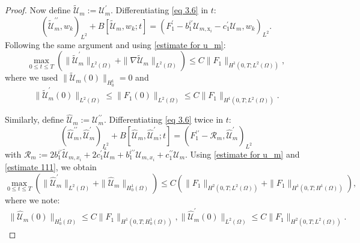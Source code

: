 \documentclass[11pt,reqno,oneside]{amsart}
\numberwithin{equation}{section}
\theoremstyle{definition}
\theoremstyle{remark}
\numberwithin{equation}{section}
\begin{document}
\begin{proof}
		Now define $\tilde{\mathcal{U}}_m := \mathcal{U}_{m}^{\prime}$. Differentiating \eqref{eq 3.6} in $t$:
		\begin{equation*}
			\left( \tilde{\mathcal{U}}^{\prime\prime}_m, w_k \right)_{L^2} + B[\tilde{\mathcal{U}}_m, w_k; t] = \left( F_1^{\prime} - b^{i\prime}_1 \mathcal{U}_{m,\mathrm{x}_i} - c^{\prime}_1 \mathcal{U}_m, w_k \right)_{L^2}.
		\end{equation*}
		Following the same argument and using \eqref{estimate for u_m}:
		\begin{equation}\label{estimate 111}
			\max_{0 \leqslant t \leqslant T} \left( \| \tilde{\mathcal{U}}_{m}^{\prime} \|_{L^2(\Omega)} + \| \nabla \tilde{\mathcal{U}}_m \|_{L^2(\Omega)} \right) 
			\leqslant C \| F_1 \|_{H^1(0,T;L^2(\Omega))},
		\end{equation}
		where we used $\|\tilde{\mathcal{U}}_m(0) \|_{H^1_0} = 0$ and
		\begin{equation*}
			\| \tilde{\mathcal{U}}_m^{\prime}(0) \|_{L^2(\Omega)} \leqslant \| F_1(0) \|_{L^2(\Omega)} \leqslant C \| F_1 \|_{H^1(0,T;L^2(\Omega))}.
		\end{equation*}
		
		Similarly, define $\hat{\mathcal{U}}_m := \mathcal{U}_m^{\prime\prime}$. Differentiating \eqref{eq 3.6} twice in $t$:
		\begin{equation*}
			\left( \hat{\mathcal{U}}_m^{\prime \prime}, \hat{\mathcal{U}}_m^{\prime} \right)_{L^2} + B[\hat{\mathcal{U}}_m, \hat{\mathcal{U}}_m^{\prime}; t] = \left( F_1^{\prime\prime} - \mathcal{R}_m, \hat{\mathcal{U}}_m^{\prime} \right)_{L^2}
		\end{equation*}
		with $\mathcal{R}_m := 2b_1^{i\prime} \tilde{\mathcal{U}}_{m,x_i} + 2c_1^{\prime} \tilde{\mathcal{U}}_m + b_1^{i\prime\prime} \mathcal{U}_{m,x_i} + c_1^{\prime\prime} \mathcal{U}_m$. Using \eqref{estimate for u_m} and \eqref{estimate 111}, we obtain
		\begin{equation}\label{estimate of the derivative of u_m}
			\max_{0 \leqslant t \leqslant T} \left( \| \hat{\mathcal{U}}_{m}^{\prime} \|_{L^2(\Omega)} + \|  \hat{\mathcal{U}}_m \|_{H^1_0(\Omega)} \right) 
			\leqslant C \left( \| F_1 \|_{H^2(0,T;L^2(\Omega))} + \| F_1 \|_{H^1(0,T;H^1(\Omega))} \right),
		\end{equation}
		where we note:
		\begin{gather*}
			\| \hat{\mathcal{U}}_m(0) \|_{H^1_0(\Omega)} \leqslant C \| F_1 \|_{H^1(0,T;H^1_0(\Omega))}, \| \hat{\mathcal{U}}_m^{\prime}(0) \|_{L^2(\Omega)} \leqslant C \| F_1 \|_{H^2(0,T;L^2(\Omega))}.
		\end{gather*}
		

\end{proof}
\end{document}
